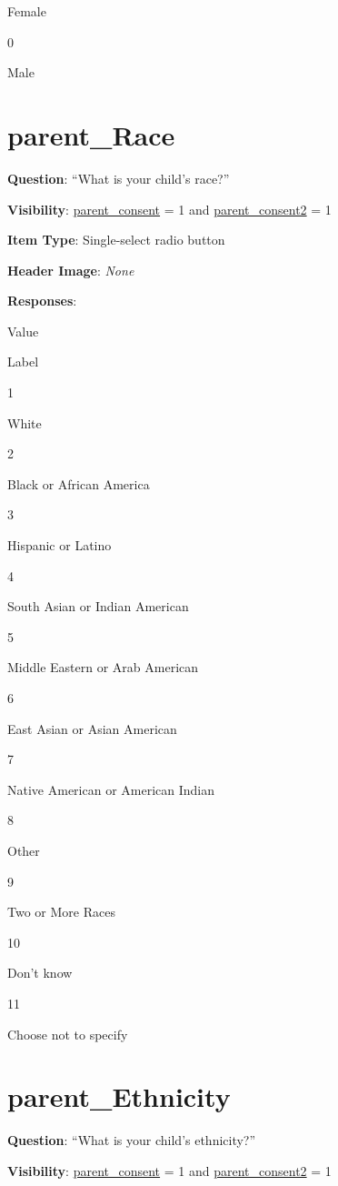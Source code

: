 \documentclass[]{book}
\begin{document}
Female

0

Male

\hypertarget{parent_race}{%
\section{parent\_Race}\label{parent_race}}

\textbf{Question}: ``What is your child's race?''

\textbf{Visibility}: \protect\hyperlink{parent_consent}{parent\_consent} = 1 and \protect\hyperlink{parent_consent2}{parent\_consent2} = 1

\textbf{Item Type}: Single-select radio button

\textbf{Header Image}: \emph{None}

\textbf{Responses}:

Value

Label

1

White

2

Black or African America

3

Hispanic or Latino

4

South Asian or Indian American

5

Middle Eastern or Arab American

6

East Asian or Asian American

7

Native American or American Indian

8

Other

9

Two or More Races

10

Don't know

11

Choose not to specify

\hypertarget{parent_ethnicity}{%
\section{parent\_Ethnicity}\label{parent_ethnicity}}

\textbf{Question}: ``What is your child's ethnicity?''

\textbf{Visibility}: \protect\hyperlink{parent_consent}{parent\_consent} = 1 and \protect\hyperlink{parent_consent2}{parent\_consent2} = 1
\end{document}
